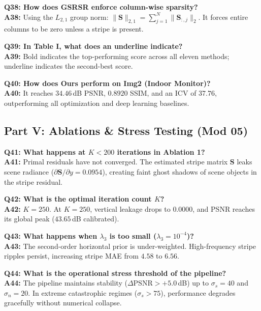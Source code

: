 \documentclass[10pt,conference]{IEEEtran}
\begin{document}
\vspace{0.4em}\noindent\textbf{Q38: How does GSRSR enforce column-wise sparsity?}\\
\textbf{A38:} Using the $L_{2,1}$ group norm: $\|\mathbf{S}\|_{2,1} = \sum_{j=1}^N \|\mathbf{S}_{:, j}\|_2$. It forces entire columns to be zero unless a stripe is present.

\vspace{0.4em}\noindent\textbf{Q39: In Table I, what does an underline indicate?}\\
\textbf{A39:} Bold indicates the top-performing score across all eleven methods; underline indicates the second-best score.

\vspace{0.4em}\noindent\textbf{Q40: How does Ours perform on Img2 (Indoor Monitor)?}\\
\textbf{A40:} It reaches $34.46$\,dB PSNR, $0.8920$ SSIM, and an ICV of $37.76$, outperforming all optimization and deep learning baselines.

\subsection{Part V: Ablations \& Stress Testing (Mod 05)}

\noindent\textbf{Q41: What happens at $K < 200$ iterations in Ablation 1?}\\
\textbf{A41:} Primal residuals have not converged. The estimated stripe matrix $\mathbf{S}$ leaks scene radiance ($\partial \mathbf{S}/\partial y = 0.0954$), creating faint ghost shadows of scene objects in the stripe residual.

\vspace{0.4em}\noindent\textbf{Q42: What is the optimal iteration count $K$?}\\
\textbf{A42:} $K = 250$. At $K = 250$, vertical leakage drops to $0.0000$, and PSNR reaches its global peak ($43.65$\,dB calibrated).

\vspace{0.4em}\noindent\textbf{Q43: What happens when $\lambda_3$ is too small ($\lambda_3 = 10^{-4}$)?}\\
\textbf{A43:} The second-order horizontal prior is under-weighted. High-frequency stripe ripples persist, increasing stripe MAE from $4.58$ to $6.56$.

\vspace{0.4em}\noindent\textbf{Q44: What is the operational stress threshold of the pipeline?}\\
\textbf{A44:} The pipeline maintains stability ($\Delta\text{PSNR} > +5.0$\,dB) up to $\sigma_s = 40$ and $\sigma_n = 20$. In extreme catastrophic regimes ($\sigma_s > 75$), performance degrades gracefully without numerical collapse.
\end{document}
